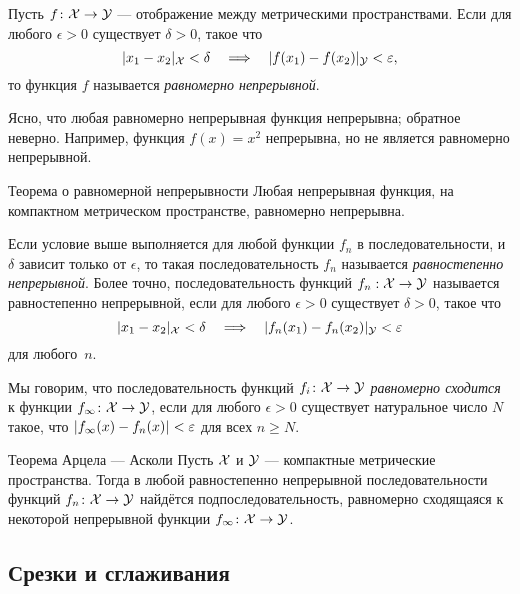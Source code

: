 Пусть $f\colon{\mathcal{X}}\to \mathcal{Y}$ --- отображение между метрическими пространствами.
Если для любого $\epsilon>0$ существует $\delta>0$, такое что 
\[\dist{x_1}{x_2}{\spc{X}}<\delta\quad\Longrightarrow\quad \dist{f(x_1)}{f(x_2)}{\spc{Y}}<\epsilon,\]
то функция $f$ называется \emph{равномерно непрерывной}.

Ясно, что любая равномерно непрерывная функция непрерывна;
обратное неверно.
Например, функция $f(x)=x^2$ непрерывна, но не является равномерно непрерывной.

{\sloppy

\begin{thm}{Теорема о равномерной непрерывности}
Любая непрерывная функция, на компактном метрическом пространстве, равномерно непрерывна.
\end{thm}

}

Если условие выше выполняется для любой функции $f_n$ в последовательности, и $\delta$ зависит только от $\epsilon$,
то такая последовательность $f_n$ называется \emph{равностепенно непрерывной}.
Более точно, 
последовательность функций $f_n:{\mathcal{X}}\to \mathcal{Y}$ называется равностепенно непрерывной, если 
для любого $\epsilon>0$ существует $\delta>0$, такое что 
\[\dist{x_1}{x_2}{\spc{X}}<\delta\quad\Longrightarrow\quad \dist{f_n(x_1)}{f_n(x_2)}{\spc{Y}}<\epsilon\]
для любого~$n$.

Мы говорим, что последовательность функций $f_i\colon {\mathcal{X}} \to \mathcal{Y}$ \emph{равномерно сходится} к функции $f_{\infty}\colon {\mathcal{X}} \to \mathcal{Y}$, если для любого 
$\epsilon>0$ существует натуральное число $N$ такое, что $\dist{f_{\infty}(x)}{f_n (x)}{}<\epsilon$ для всех $n \ge N$.

{\sloppy

\begin{thm}{Теорема Арцела --- Асколи}\label{lem:equicontinuous}
Пусть $\mathcal{X}$ и $\mathcal{Y}$ --- компактные метрические пространства. 
Тогда в любой равностепенно непрерывной последовательности функций $f_n\:\spc{X}\z\to \spc{Y}$ найдётся подпоследовательность, равномерно сходящаяся к некоторой непрерывной функции $f_\infty\:\spc{X}\z\to \spc{Y}$. 
\end{thm}

}

\subsection*{Срезки и сглаживания}

